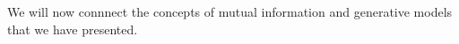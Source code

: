 We will now connnect the concepts of mutual information and generative models that we have presented. 